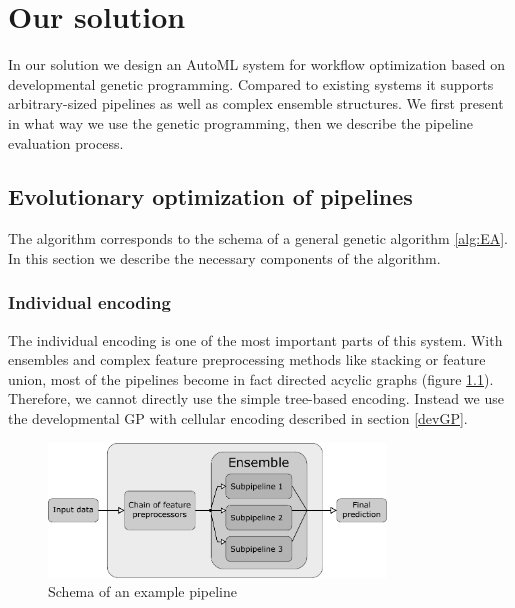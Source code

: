 \chapter{Our solution} \label{our:solution}






In our solution we design an AutoML system for workflow optimization based on
developmental genetic programming. Compared to existing systems it supports 
arbitrary-sized pipelines as well as complex ensemble structures. We first
present in what way we use the genetic programming, then we describe the
pipeline evaluation process.

\section{Evolutionary optimization of pipelines}
The algorithm corresponds to the schema of a general genetic algorithm
\ref{alg:EA}. In this section we describe the necessary components of the
algorithm.

\subsection{Individual encoding}
The individual encoding is one of the most important parts of this system. With
ensembles and complex feature preprocessing methods like stacking or feature
union, most of the pipelines become in fact directed acyclic graphs (figure 
\ref{pic02:pipeline}). Therefore, we cannot directly use the simple tree-based
encoding. Instead we use the developmental GP with cellular encoding described
in section \ref{devGP}.
\begin{figure}[ht]\centering
\includegraphics[width=0.8\textwidth]{../img/pipeline-pdfa.pdf}
\caption{Schema of an example pipeline}
\label{pic02:pipeline}
\end{figure}

